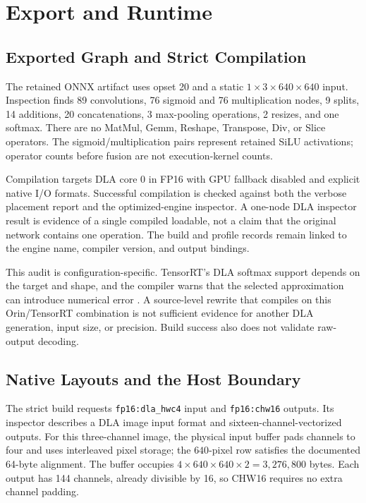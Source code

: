 \section{Export and Runtime}
\label{sec:deployment}
\subsection{Exported Graph and Strict Compilation}
The retained ONNX artifact uses opset 20 and a static $1\times3\times640\times640$
input. Inspection finds 89 convolutions, 76 sigmoid and 76 multiplication nodes,
9 splits, 14 additions, 20 concatenations, 3 max-pooling operations, 2 resizes,
and one softmax. There are no MatMul, Gemm, Reshape, Transpose, Div, or Slice
operators. The sigmoid/multiplication pairs represent retained SiLU activations;
operator counts before fusion are not execution-kernel counts.

Compilation targets DLA core 0 in FP16 with GPU fallback disabled and explicit
native I/O formats. Successful compilation is checked against both the verbose
placement report and the optimized-engine inspector. A one-node DLA inspector
result is evidence of a single compiled loadable, not a claim that the original
network contains one operation. The build and profile records remain linked to
the engine name, compiler version, and output bindings.

This audit is configuration-specific. TensorRT's DLA softmax support depends on
the target and shape, and the compiler warns that the selected approximation
can introduce numerical error \cite{nvidia_dla_working}. A source-level
rewrite that compiles on this Orin/TensorRT combination is not sufficient
evidence for another DLA generation, input size, or precision. Build success
also does not validate raw-output decoding.

\subsection{Native Layouts and the Host Boundary}
\label{sec:packing}
The strict build requests \texttt{fp16:dla\_hwc4} input and
\texttt{fp16:chw16} outputs. Its inspector describes a DLA image input format
and sixteen-channel-vectorized outputs. For this three-channel image, the
physical input buffer pads channels to four and uses interleaved pixel storage;
the $640$-pixel row satisfies the documented 64-byte alignment. The buffer
occupies $4\times640\times640\times2=3{,}276{,}800$ bytes. Each output has
144 channels, already divisible by 16, so CHW16 requires no extra channel
padding.

